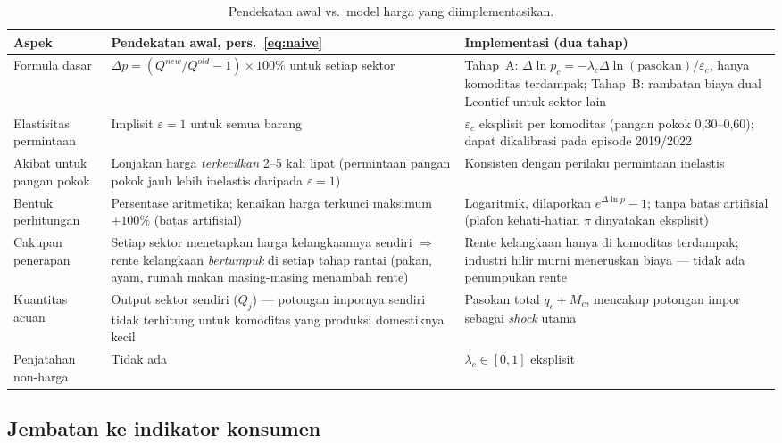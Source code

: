 \documentclass[11pt,a4paper]{article}
\newcommand{\en}[1]{\textit{#1}}   %
\begin{document}
\begin{table}[ht]
\centering\small
\caption{Pendekatan awal vs.\ model harga yang diimplementasikan.}
\label{tab:vsprice}
\begin{tabular}{@{}p{3.4cm}p{5.1cm}p{5.6cm}@{}}
\toprule
\textbf{Aspek} & \textbf{Pendekatan awal, pers.~\eqref{eq:naive}} &
\textbf{Implementasi (dua tahap)} \\
\midrule
Formula dasar &
$\Delta p = (Q^{new}/Q^{old} - 1) \times 100\%$ untuk setiap sektor &
Tahap~A: $\Delta\ln p_c = -\lambda_c \Delta\ln(\text{pasokan})/
\varepsilon_c$, hanya komoditas terdampak; Tahap~B: rambatan biaya dual
Leontief untuk sektor lain \\
\addlinespace[3pt]
Elastisitas permintaan &
Implisit $\varepsilon = 1$ untuk semua barang &
$\varepsilon_c$ eksplisit per komoditas (pangan pokok 0{,}30--0{,}60);
dapat dikalibrasi pada episode 2019/2022 \\
\addlinespace[3pt]
Akibat untuk pangan pokok &
Lonjakan harga \emph{terkecilkan} 2--5 kali lipat (permintaan pangan
pokok jauh lebih inelastis daripada $\varepsilon = 1$) &
Konsisten dengan perilaku permintaan inelastis \\
\addlinespace[3pt]
Bentuk perhitungan &
Persentase aritmetika; kenaikan harga terkunci maksimum $+100\%$
(batas artifisial) &
Logaritmik, dilaporkan $e^{\Delta\ln p} - 1$; tanpa batas artifisial
(plafon kehati-hatian $\bar\pi$ dinyatakan eksplisit) \\
\addlinespace[3pt]
Cakupan penerapan &
Setiap sektor menetapkan harga kelangkaannya sendiri $\Rightarrow$ rente
kelangkaan \emph{bertumpuk} di setiap tahap rantai (pakan, ayam, rumah
makan masing-masing menambah rente) &
Rente kelangkaan hanya di komoditas terdampak; industri hilir murni
meneruskan biaya --- tidak ada penumpukan rente \\
\addlinespace[3pt]
Kuantitas acuan &
Output sektor sendiri ($Q_j$) --- potongan impornya sendiri tidak
terhitung untuk komoditas yang produksi domestiknya kecil &
Pasokan total $q_c + M_c$, mencakup potongan impor sebagai \en{shock}
utama \\
\addlinespace[3pt]
Penjatahan non-harga &
Tidak ada &
$\lambda_c \in [0,1]$ eksplisit \\
\bottomrule
\end{tabular}
\end{table}

\subsection{Jembatan ke indikator konsumen}
\end{document}
